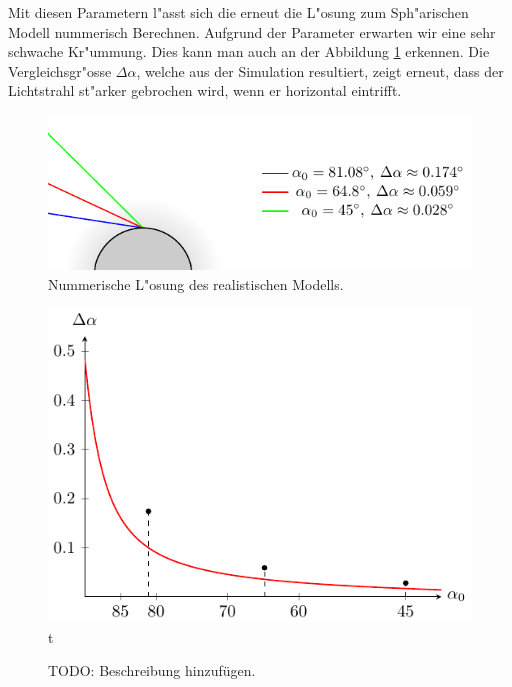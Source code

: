 \begin{refsection}
Mit diesen Parametern l"asst sich die erneut die L"osung zum Sph"arischen Modell nummerisch Berechnen. 
Aufgrund der Parameter erwarten wir eine sehr schwache Kr"ummung. 
Dies kann man auch an der Abbildung \ref{fig:sphere_real} erkennen. 
Die Vergleichsgr"osse $\Delta \alpha$, welche aus der Simulation resultiert, zeigt erneut, dass der Lichtstrahl st"arker gebrochen wird, wenn er horizontal eintrifft. 

\begin{figure}
  \centering
  \includegraphics[scale=1]{licht/standalone/fig_real_simulation.pdf}
  \caption{Nummerische L"osung des realistischen Modells. \label{fig:sphere_real} } 
\end{figure}

\begin{figure}
  \centering
  \includegraphics[scale=1]{licht/standalone/fig_real_comparison.pdf}t
  \caption{TODO: Beschreibung hinzufügen. \label{fig:real_comparison}}
\end{figure}

\printbibliography[heading=subbibliography]
\end{refsection}